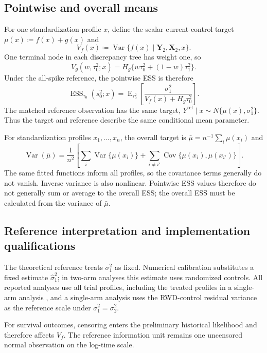 \documentclass[11pt]{article}
\newcommand{\E}{\operatorname{E}}
\newcommand{\Var}{\operatorname{Var}}
\newcommand{\Cov}{\operatorname{Cov}}
\newcommand{\ESS}{\operatorname{ESS}}
\theoremstyle{remark}\newtheorem{remark}{Remark}[section]
\providecommand{\DIFaddtex}[1]{{\protect\color{blue} \sf #1}} %
\providecommand{\DIFaddbegin}{} %
\providecommand{\DIFaddend}{} %
\providecommand{\DIFadd}[1]{\texorpdfstring{\DIFaddtex{#1}}{#1}} %
\begin{document}
\subsection{Pointwise and overall means}\label{sec:B.6}
For one standardization profile $x$, define the scalar current-control target $\mu(x)\coloneqq f(x)+g(x)$ and
\[
V_f(x)\coloneqq
\Var\{f(x)\mid\mathbf Y_2,\mathbf X_2,x\}.
\]
One terminal node in each discrepancy tree has weight one, so
\[
V_g(w,\tau_0^2;x)
=H_g\{w\tau_0^2+(1-w)\tau_1^2\}.
\]
Under the all-spike reference, the pointwise ESS is therefore
\[
\ESS_{\tau_0}(s_0^2;x)
=\E_{\tau_0^2}\!\left[
\frac{\sigma_1^2}{V_f(x)+H_g\tau_0^2}
\right].
\]
The matched reference observation has the same target, $Y^{\mathrm{ref}}\mid x\sim N\{\mu(x),\sigma_1^2\}$. Thus the target and reference describe the same conditional mean parameter.

For standardization profiles $x_1,\ldots,x_n$, the overall target is $\bar\mu=n^{-1}\sum_i\mu(x_i)$ and
\begin{equation}\label{eq:nonadd}
\Var(\bar\mu)
=\frac{1}{n^2}\left[
\sum_i\Var\{\mu(x_i)\}
+\sum_{i\ne i'}\Cov\{\mu(x_i),\mu(x_{i'})\}
\right].
\end{equation}
The same fitted functions inform all profiles, so the covariance terms generally do not vanish. Inverse variance is also nonlinear. Pointwise ESS values therefore do not generally sum or average to the overall ESS; the overall ESS must be calculated from the variance of $\bar\mu$.

\subsection{Reference interpretation and implementation qualifications}\label{sec:B.7}
The theoretical reference treats $\sigma_1^2$ as fixed. Numerical calibration substitutes a fixed estimate $\widehat\sigma_1^2$; in two-arm analyses this estimate uses randomized controls.  \DIFaddbegin \DIFadd{All reported analyses use all trial profiles, including the treated profiles in a }\DIFaddend single-arm analysis \DIFaddbegin \DIFadd{, and a single-arm analysis }\DIFaddend uses the RWD-control residual variance as the reference scale under $\sigma_1^2=\sigma_2^2$.

For survival outcomes, censoring enters the preliminary historical likelihood and therefore affects $V_f$. The reference information unit remains one uncensored normal observation on the log-time scale.
\end{document}
